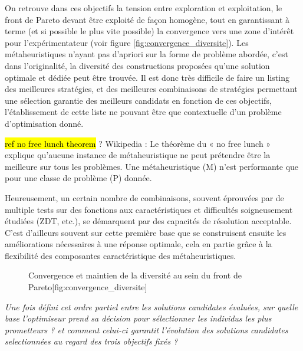 On retrouve dans ces objectifs la tension entre exploration et exploitation, le front de Pareto devant être exploité de façon homogène, tout en garantissant à terme (et si possible le plus vite possible) la convergence vers une zone d'intérêt pour l'expérimentateur (voir figure \ref{fig:convergence_diversite}). Les métaheuristiques n'ayant pas d'apriori sur la forme de problème abordée, c'est dans l'originalité, la diversité des constructions proposées qu'une solution optimale et dédiée peut être trouvée. Il est donc très difficile de faire un listing des meilleures stratégies, et des meilleures combinaisons de stratégies permettant une sélection garantie des meilleurs candidats en fonction de ces objectifs, l'établissement de cette liste ne pouvant être que contextuelle d'un problème d'optimisation donné.

\hl{ref no free lunch theorem }? Wikipedia : Le théorème du « no free lunch » explique qu’aucune instance de métaheuristique ne peut prétendre être la meilleure sur tous les problèmes. Une métaheuristique (M) n’est performante que pour une classe de problème (P) donnée.

Heureusement, un certain nombre de combinaisons, souvent éprouvées par de multiple tests sur des fonctions aux caractéristiques et difficultés soigneusement étudiées (ZDT, etc.), se démarquent par des capacités de résolution acceptable. C'est d'ailleurs souvent sur cette première base que se construisent ensuite les améliorations nécessaires à une réponse optimale, cela en partie grâce à la flexibilité des composantes caractéristique des métaheuristiques.

\begin{figure}[!htbp]
  \begin{sidecaption}[fortoc]{Convergence et maintien de la diversité au sein du front de Pareto}[fig:convergence_diversite]
  \centering
  \qquad
 \end{sidecaption}
\end{figure}

\textit{Une fois défini cet ordre partiel entre les solutions candidates évaluées, sur quelle base l'optimiseur prend sa décision pour sélectionner les individus les plus prometteurs ? et comment celui-ci garantit l'évolution des solutions candidates selectionnées au regard des trois objectifs fixés ?}

